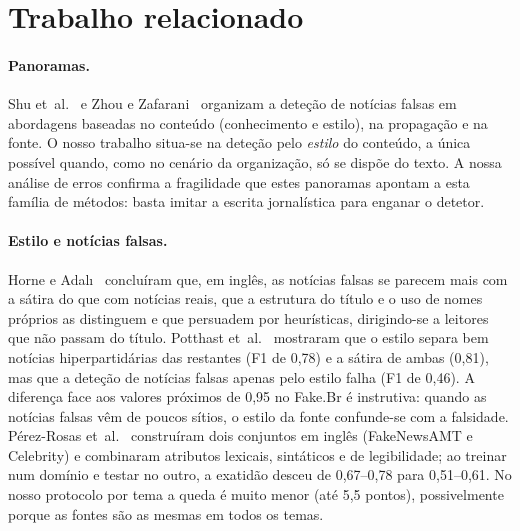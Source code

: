 \section{Trabalho relacionado}\label{sec:rel}

\paragraph{Panoramas.}
Shu et~al.~\cite{shu2017} e Zhou e Zafarani~\cite{zhou2020} organizam a deteção de notícias falsas
em abordagens baseadas no conteúdo (conhecimento e estilo), na propagação e na fonte. O nosso
trabalho situa-se na deteção pelo \emph{estilo} do conteúdo, a única possível quando, como no
cenário da organização, só se dispõe do texto. A nossa análise de erros confirma a fragilidade que
estes panoramas apontam a esta família de métodos: basta imitar a escrita jornalística para enganar
o detetor.

\paragraph{Estilo e notícias falsas.}
Horne e Adal{\i}~\cite{horne2017} concluíram que, em inglês, as notícias falsas se parecem mais com
a sátira do que com notícias reais, que a estrutura do título e o uso de nomes próprios as distinguem
e que persuadem por heurísticas, dirigindo-se a leitores que não passam do título. Potthast
et~al.~\cite{potthast2018} mostraram que o estilo separa bem notícias hiperpartidárias das restantes
(F1 de 0,78) e a sátira de ambas (0,81), mas que a deteção de notícias falsas apenas pelo estilo
falha (F1 de 0,46). A diferença face aos valores próximos de 0,95 no Fake.Br é instrutiva: quando as
notícias falsas vêm de poucos sítios, o estilo da fonte confunde-se com a falsidade. Pérez-Rosas
et~al.~\cite{perezrosas2018} construíram dois conjuntos em inglês (FakeNewsAMT e Celebrity) e
combinaram atributos lexicais, sintáticos e de legibilidade; ao treinar num domínio e testar no
outro, a exatidão desceu de 0,67--0,78 para 0,51--0,61. No nosso protocolo por tema a queda é muito
menor (até 5,5 pontos), possivelmente porque as fontes são as mesmas em todos os temas.

